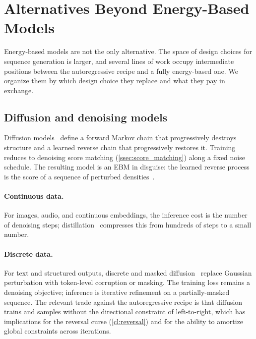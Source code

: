 
\section{Alternatives Beyond Energy-Based Models}
\label{sec:other_alts}

Energy-based models are not the only alternative.
The space of design choices for sequence generation is larger, and several lines of work occupy intermediate positions between the autoregressive recipe and a fully energy-based one.
We organize them by which design choice they replace and what they pay in exchange.

\subsection{Diffusion and denoising models}
\label{ssec:diffusion}

Diffusion models~\citep{sohldickstein2015deep,ho2020denoising,song2021scorebased,nichol2021improved} define a forward Markov chain that progressively destroys structure and a learned reverse chain that progressively restores it.
Training reduces to denoising score matching (\cref{ssec:score_matching}) along a fixed noise schedule.
The resulting model is an EBM in disguise: the learned reverse process is the score of a sequence of perturbed densities~\citep{song2021maximum}.
\paragraph{Continuous data.}
For images, audio, and continuous embeddings, the inference cost is the number of denoising steps;
distillation~\citep{salimans2022progressive,song2023consistency} compresses this from hundreds of steps to a small number.
\paragraph{Discrete data.}
For text and structured outputs, discrete and masked diffusion~\citep{austin2021structured,hoogeboom2021argmax,lou2023discrete,nie2024scaling} replace Gaussian perturbation with token-level corruption or masking.
The training loss remains a denoising objective;
inference is iterative refinement on a partially-masked sequence.
The relevant trade against the autoregressive recipe is that diffusion trains and samples without the directional constraint of left-to-right, which has implications for the reversal curse (\ref{cl:reversal}) and for the ability to amortize global constraints across iterations.

